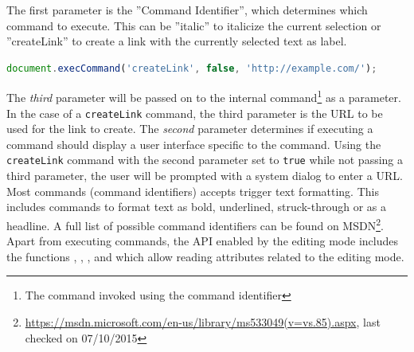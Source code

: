\begin{table}[]
\centering
{}
\caption{execCommand parameters}
\label{table:execcommand_parameters}
\end{table}


The first parameter is the ''Command Identifier'', which determines which command to execute. This can be ''italic'' to italicize the current selection or ''createLink'' to create a link with the currently selected text as label.

\begin{lstlisting}[language=JavaScript, caption=Creating a link using the HTML editing API, label=lst:execcommand-link]
document.execCommand('createLink', false, 'http://example.com/');
\end{lstlisting}

The \textit{third} parameter will be passed on to the internal command\footnote{The command invoked using the command identifier} as a parameter. In the case of a \texttt{createLink} command, the third parameter is the URL to be used for the link to create. The \textit{second} parameter determines if executing a command should display a user interface specific to the command. Using the \texttt{createLink} command with the second parameter set to \texttt{true} while not passing a third parameter, the user will be prompted with a system dialog to enter a URL. Most commands (command identifiers)  accepts trigger text formatting. This includes commands to format text as bold, underlined, struck-through or as a headline. A full list of possible command identifiers can be found on MSDN\footnote{\url{https://msdn.microsoft.com/en-us/library/ms533049(v=vs.85).aspx}, last checked on 07/10/2015}. Apart from executing commands, the API enabled by the editing mode includes the functions , , ,  and  which allow reading attributes related to the editing mode. %




